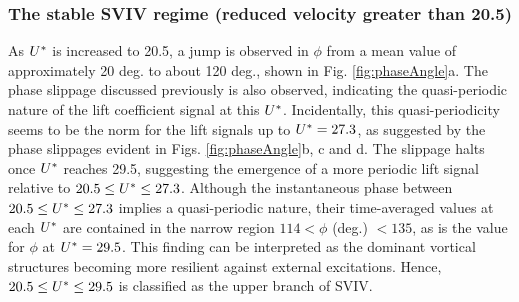 \documentclass[oneside]{utmthesis}
\begin{document}
\subsubsection{The stable SVIV regime (reduced velocity greater than 20.5)} \label{sssec:svivRegime}

As $U^{*}$ is increased to 20.5, a jump is observed in $\phi$ from a mean value of approximately 20 deg. to about 120 deg., shown in Fig. \ref{fig:phaseAngle}a. The phase slippage discussed previously is also observed, indicating the quasi-periodic nature of the lift coefficient signal at this $U^{*}$. Incidentally, this quasi-periodicity seems to be the norm for the lift signals up to $U^{*} = 27.3$, as suggested by the phase slippages evident in Figs. \ref{fig:phaseAngle}b, c and d. The slippage halts once $U^{*}$ reaches 29.5, suggesting the emergence of a more periodic lift signal relative to $20.5 \leq U^{*} \leq 27.3$. Although the instantaneous phase between $20.5 \leq U^{*} \leq 27.3$ implies a quasi-periodic nature, their time-averaged values at each $U^{*}$ are contained in the narrow region $114 < \phi$ (deg.) $< 135$, as is the value for $\phi$ at $U^{*} = 29.5$. This finding can be interpreted as the dominant vortical structures becoming more resilient against external excitations. Hence, $20.5 \leq U^{*} \leq 29.5$ is classified as the upper branch of SVIV.
\end{document}
